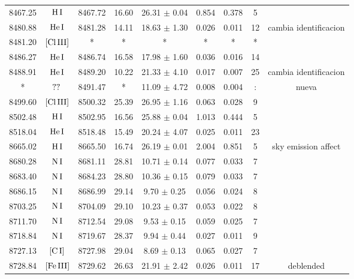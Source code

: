 \documentclass{article}
\begin{document}
\begin{table*}
\begin{adjustbox}{width=\textwidth}
\begin{tabular}{ccccccccc}
8467.25 & $\mbox{H}\thinspace \mbox{I}$ & 8467.72 & 16.60 & 26.31 $\pm$ 0.04 & 0.854 & 0.378 & 5 &  \\
8480.88 & $\mbox{He}\thinspace \mbox{I}$ & 8481.28 & 14.11 & 18.63 $\pm$ 1.30 & 0.026 & 0.011 & 12 &  cambia identificacion \\
8481.20 & $\mbox{[Cl}\thinspace \mbox{III]}$ & * & * & * & * & * & * &  \\
8486.27 & $\mbox{He}\thinspace \mbox{I}$ & 8486.74 & 16.58 & 17.98 $\pm$ 1.60 & 0.036 & 0.016 & 14 &  \\
8488.91 & $\mbox{He}\thinspace \mbox{I}$ & 8489.20 & 10.22 & 21.33 $\pm$ 4.10 & 0.017 & 0.007 & 25 &  cambia identificacion \\
* & $\mbox{??}\thinspace \mbox{}$ & 8491.47 & * & 11.09 $\pm$ 4.72 & 0.008 & 0.004 & : &  nueva \\
8499.60 & $\mbox{[Cl}\thinspace \mbox{III]}$ & 8500.32 & 25.39 & 26.95 $\pm$ 1.16 & 0.063 & 0.028 & 9 &  \\
8502.48 & $\mbox{H}\thinspace \mbox{I}$ & 8502.95 & 16.56 & 25.88 $\pm$ 0.04 & 1.013 & 0.444 & 5 &  \\
8518.04 & $\mbox{He}\thinspace \mbox{I}$ & 8518.48 & 15.49 & 20.24 $\pm$ 4.07 & 0.025 & 0.011 & 23 &  \\
8665.02 & $\mbox{H}\thinspace \mbox{I}$ & 8665.50 & 16.74 & 26.19 $\pm$ 0.01 & 2.004 & 0.851 & 5 &  sky emission affect \\
8680.28 & $\mbox{N}\thinspace \mbox{I}$ & 8681.11 & 28.81 & 10.71 $\pm$ 0.14 & 0.077 & 0.033 & 7 &  \\
8683.40 & $\mbox{N}\thinspace \mbox{I}$ & 8684.23 & 28.80 & 10.36 $\pm$ 0.15 & 0.079 & 0.033 & 7 &  \\
8686.15 & $\mbox{N}\thinspace \mbox{I}$ & 8686.99 & 29.14 & 9.70 $\pm$ 0.25 & 0.056 & 0.024 & 8 &  \\
8703.25 & $\mbox{N}\thinspace \mbox{I}$ & 8704.09 & 29.10 & 10.23 $\pm$ 0.37 & 0.053 & 0.022 & 8 &  \\
8711.70 & $\mbox{N}\thinspace \mbox{I}$ & 8712.54 & 29.08 & 9.53 $\pm$ 0.15 & 0.059 & 0.025 & 7 &  \\
8718.84 & $\mbox{N}\thinspace \mbox{I}$ & 8719.67 & 28.37 & 9.94 $\pm$ 0.44 & 0.027 & 0.011 & 9 &  \\
8727.13 & $\mbox{[C}\thinspace \mbox{I]}$ & 8727.98 & 29.04 & 8.69 $\pm$ 0.13 & 0.065 & 0.027 & 7 &  \\
8728.84 & $\mbox{[Fe}\thinspace \mbox{III]}$ & 8729.62 & 26.63 & 21.91 $\pm$ 2.42 & 0.026 & 0.011 & 17 &  deblended \\

\end{tabular}
\end{adjustbox}
\end{table*}
\end{document}
